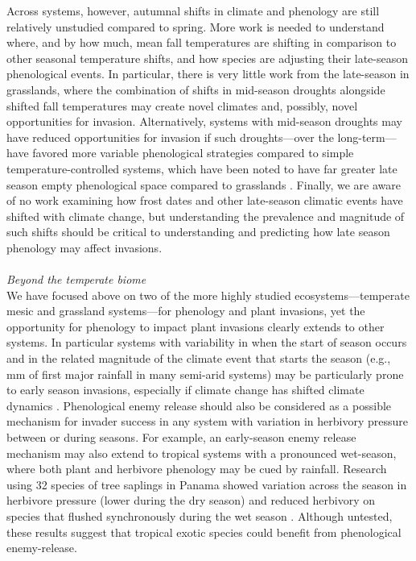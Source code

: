 \documentclass[11pt,a4paper,oneside]{article}
\begin{document}
Across systems, however, autumnal shifts in climate and phenology are still relatively unstudied compared to spring. More work is needed to understand where, and by how much, mean fall temperatures are shifting in comparison to other seasonal temperature shifts, and how species are adjusting their late-season phenological events. In particular, there is very little work from the late-season in grasslands, where the combination of shifts in mid-season droughts alongside shifted fall temperatures may create novel climates and, possibly, novel opportunities for invasion. Alternatively, systems with mid-season droughts may have reduced opportunities for invasion if such droughts---over the long-term---have favored more variable phenological strategies \citep[e.g., species flower very late to avoid stress of mid-season drought, see][]{Craine:2012eco} compared to simple temperature-controlled systems, which have been noted to have far greater late season empty phenological space compared to grasslands \citep{Craine:2012eco}. Finally, we are aware of no work examining how frost dates and other late-season climatic events have shifted with climate change, but understanding the prevalence and magnitude of such shifts should be critical to understanding and predicting how late season phenology may affect invasions. \\
\\
\noindent \emph{Beyond the temperate biome}\\
We have focused above on two of the more highly studied ecosystems---temperate mesic and grassland systems---for phenology and plant invasions, yet the opportunity for phenology to impact plant invasions clearly extends to other systems. In particular systems with variability in when the start of season occurs and in the related magnitude of the climate event that starts the season (e.g., mm of first major rainfall in many semi-arid systems) may be particularly prone to early season invasions, especially if climate change has shifted climate dynamics \citep[for a longer discussion see][]{wolkovich:2010fee}. Phenological enemy release should also be considered as a possible mechanism for invader success in any system with variation in herbivory pressure between or during seasons. For example, an early-season enemy release mechanism may also extend to tropical systems with a pronounced wet-season, where both plant and herbivore phenology may be cued by rainfall. Research using 32 species of tree saplings in Panama showed variation across the season in herbivore pressure (lower during the dry season) and reduced herbivory on species that flushed synchronously during the wet season \citep{aide1993}.  Although untested, these results suggest that tropical exotic species could benefit from phenological enemy-release.\\
\end{document}
